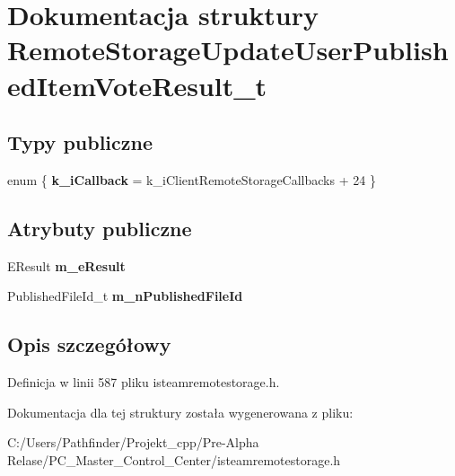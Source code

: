 \hypertarget{struct_remote_storage_update_user_published_item_vote_result__t}{}\section{Dokumentacja struktury Remote\+Storage\+Update\+User\+Published\+Item\+Vote\+Result\+\_\+t}
\label{struct_remote_storage_update_user_published_item_vote_result__t}
\subsection*{Typy publiczne}
\begin{DoxyCompactItemize}
\item 
\mbox{\label{struct_remote_storage_update_user_published_item_vote_result__t_a1bc6845837788910ee72710b0e1220d0}} 
enum \{ {\bfseries k\+\_\+i\+Callback} = k\+\_\+i\+Client\+Remote\+Storage\+Callbacks + 24
 \}
\end{DoxyCompactItemize}
\subsection*{Atrybuty publiczne}
\begin{DoxyCompactItemize}
\item 
\mbox{\label{struct_remote_storage_update_user_published_item_vote_result__t_a5227b3814b144419bf842ee9173a2dcb}} 
E\+Result {\bfseries m\+\_\+e\+Result}
\item 
\mbox{\label{struct_remote_storage_update_user_published_item_vote_result__t_a46ffef785358113d23bb249a90576f12}} 
Published\+File\+Id\+\_\+t {\bfseries m\+\_\+n\+Published\+File\+Id}
\end{DoxyCompactItemize}


\subsection{Opis szczegółowy}


Definicja w linii 587 pliku isteamremotestorage.\+h.



Dokumentacja dla tej struktury została wygenerowana z pliku\+:\begin{DoxyCompactItemize}
\item 
C\+:/\+Users/\+Pathfinder/\+Projekt\+\_\+cpp/\+Pre-\/\+Alpha Relase/\+P\+C\+\_\+\+Master\+\_\+\+Control\+\_\+\+Center/isteamremotestorage.\+h\end{DoxyCompactItemize}
